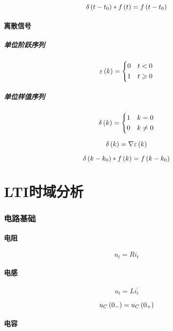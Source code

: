 \documentclass{article}
\begin{document}
\[\delta\left(t-t_0\right)\ast f\left(t\right)=f\left(t-t_0\right)\]

\subsection{离散信号}

\subsubsection{单位阶跃序列}

\[\varepsilon\left(k\right)=
    \left\{\begin{aligned}
        0 &  & t<0         \\
        1 &  & t\geqslant0
    \end{aligned}\right.\]


\subsubsection{单位样值序列}

\[\delta\left(k\right)=
    \left\{\begin{aligned}
        1 &  & k=0    \\
        0 &  & k\neq0
    \end{aligned}\right.\]

\[\delta\left(k\right)=\nabla\varepsilon\left(k\right)\]

\[\delta\left(k-k_0\right)\ast f\left(k\right)=f\left(k-k_0\right)\]

\part{LTI时域分析}

\section{电路基础}

\subsection{电阻}

\[u_t=Ri_t\]

\subsection{电感}

\[u_t=Li_t^\prime\]

\[u_C\left(0_-\right)=u_C\left(0_+\right)\]

\subsection{电容}
\end{document}
